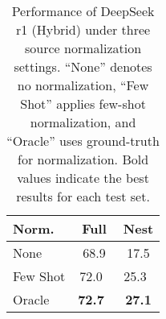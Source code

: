 \begin{table}[t]
\centering
\begin{tabular}{lcc}
\toprule
\textbf{Norm.} & \textbf{Full} & \textbf{Nest} \\
\midrule
None  & 68.9  & 17.5 \\
Few Shot  & 72.0\ & 25.3\ \\
Oracle   & \textbf{72.7}\ & \textbf{27.1} \\
\bottomrule
\end{tabular}
\caption{Performance of DeepSeek r1 (Hybrid) under three source normalization settings. “None” denotes no normalization, “Few Shot” applies few-shot normalization, and “Oracle” uses ground-truth for normalization. Bold values indicate the best results for each test set.}
\label{tab:deepseek-ablation}
\end{table}
